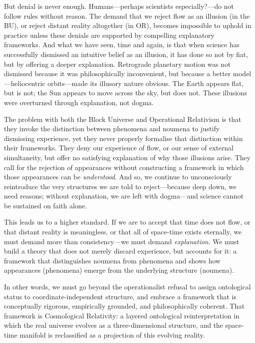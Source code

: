 \documentclass[12pt]{book}
\begin{document}
But denial is never enough. Humans---perhaps scientists especially?---do not follow rules without reason. The demand that we reject flow as an illusion (in the BU), or reject distant reality altogether (in OR), becomes impossible to uphold in practice unless these denials are supported by compelling explanatory frameworks. And what we have seen, time and again, is that when science has successfully dismissed an intuitive belief as an illusion, it has done so not by fiat, but by offering a deeper explanation. Retrograde planetary motion was not dismissed because it was philosophically inconvenient, but because a better model---heliocentric orbits---made its illusory nature obvious. The Earth appears flat, but is not; the Sun appears to move across the sky, but does not. These illusions were overturned through explanation, not dogma.

The problem with both the Block Universe and Operational Relativism is that they invoke the distinction between phenomena and noumena to justify dismissing experience, yet they never properly formalise that distinction within their frameworks. They deny our experience of flow, or our sense of external simultaneity, but offer no satisfying explanation of why those illusions arise. They call for the rejection of appearances without constructing a framework in which those appearances can be \textit{understood}. And so, we continue to unconsciously reintroduce the very structures we are told to reject---because deep down, we need reasons; without explanation, we are left with dogma---and science cannot be sustained on faith alone.

This leads us to a higher standard. If we are to accept that time does not flow, or that distant reality is meaningless, or that all of space-time exists eternally, we must demand more than consistency---we must demand \textit{explanation}. We must build a theory that does not merely discard experience, but accounts for it: a framework that distinguishes noumena from phenomena and shows how appearances (phenomena) emerge from the underlying structure (noumena).

In other words, we must go beyond the operationalist refusal to assign ontological status to coordinate-independent structure, and embrace a framework that is conceptually rigorous, empirically grounded, and philosophically coherent. That framework is Cosmological Relativity: a layered ontological reinterpretation in which the real universe evolves as a three-dimensional structure, and the space-time manifold is reclassified as a projection of this evolving reality.
\end{document}
